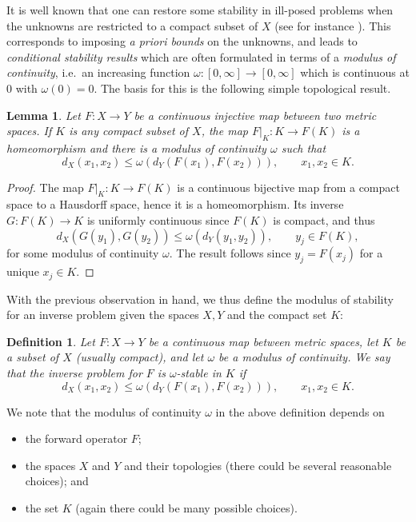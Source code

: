 \documentclass[12pt,twoside]{amsart}
\numberwithin{equation}{section}
\renewcommand{\leq}{\leqslant}
\newtheorem{lemma}[theorem]{Lemma}
\newtheorem{definition}[theorem]{Definition}
\begin{document}
It is well known that one can restore some stability in ill-posed problems when the unknowns are restricted to a compact subset of $X$ (see for instance \cite{Tikhonov, John}). This corresponds to imposing \emph{a priori bounds} on the unknowns, and leads to \emph{conditional stability results} which are often formulated in terms of a \emph{modulus of continuity}, i.e.\ an increasing function $\omega: [0,\infty] \to [0,\infty]$ which is continuous at $0$ with $\omega(0) = 0$. The basis for this is the following simple topological result.

\begin{lemma} \label{lemma_modulus_abstract}
Let $F: X \to Y$ be a continuous injective map between two metric spaces. If $K$ is any compact subset of $X$, the map $F|_K: K \to F(K)$ is a homeomorphism and there is a modulus of continuity $\omega$ such that 
\[
d_X(x_1, x_2) \leq \omega(d_Y(F(x_1), F(x_2))), \qquad x_1, x_2 \in K.
\]
\end{lemma}
\begin{proof}
The map $F|_K: K \to F(K)$ is a continuous bijective map from a compact space to a Hausdorff space, hence it is a homeomorphism. Its inverse $G: F(K) \to K$ is uniformly continuous since $F(K)$ is compact, and thus 
\[
d_X(G(y_1), G(y_2)) \leq \omega(d_Y(y_1, y_2)), \qquad y_j \in F(K),
\]
for some modulus of continuity $\omega$. The result follows since $y_j = F(x_j)$ for a unique $x_j \in K$.
\end{proof}

With the previous observation in hand, we thus define the modulus of stability for an inverse problem given the spaces $X,Y$ and the compact set $K$:

\begin{definition}
\label{def:stab_mod}
Let $F: X \to Y$ be a continuous map between metric spaces, let $K$ be a subset of $X$ (usually compact), and let $\omega$ be a modulus of continuity. We say that the \emph{inverse problem for $F$ is $\omega$-stable in $K$} if 
\[
d_X(x_1, x_2) \leq \omega(d_Y(F(x_1), F(x_2))), \qquad x_1, x_2 \in K.
\]
\end{definition}

We note that the modulus of continuity $\omega$ in the above definition depends on 
\begin{itemize}
\item 
the forward operator $F$;
\item 
the spaces $X$ and $Y$ and their topologies (there could be several reasonable choices); and 
\item 
the set $K$ (again there could be many possible choices).
\end{itemize}
\end{document}

